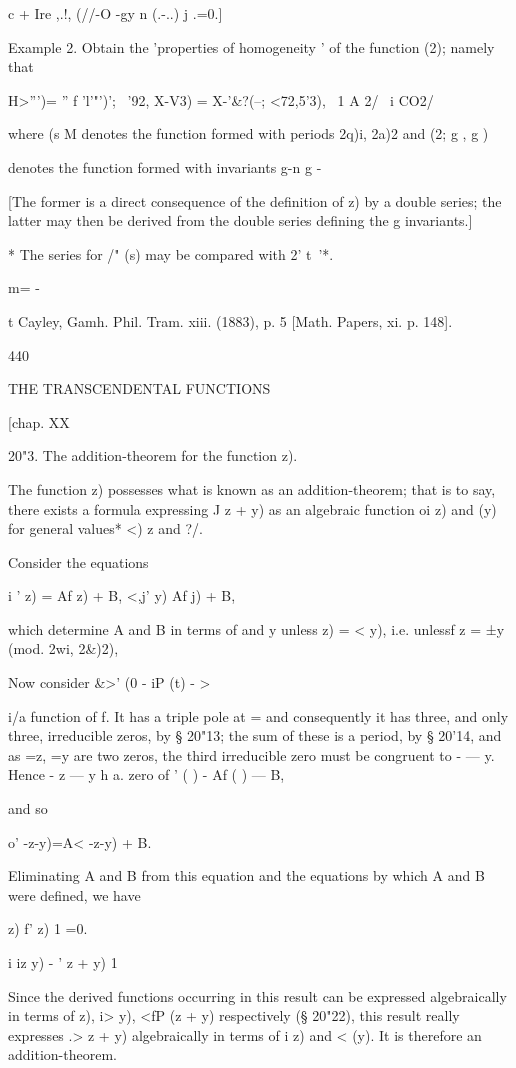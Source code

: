 {c + Ire ,.!, (//-O -gy n (.-..) j .=0.]

Example 2. Obtain the 'properties of homogeneity ' of the function
(2); namely that

 H>''')= '' f 'l'"')'; ~'92, X-V3) = X-'\&?(--; <72,5'3), \ 1 A 2/ \
i CO2/

where (s M denotes the function formed with periods 2q)i, 2a)2 and (2;
g , g )

denotes the function formed with invariants g-n g -

[The former is a direct consequence of the definition of z) by a
double series; the latter may then be derived from the double series
defining the g invariants.]

* The series for /" (s) may be compared with 2' t~'*.

m= -

t Cayley, Gamh. Phil. Tram. xiii. (1883), p. 5 [Math. Papers, xi. p.
148].

440

THE TRANSCENDENTAL FUNCTIONS

[chap. XX

20"3. The addition-theorem for the function z).

The function z) possesses what is known as an addition-theorem; that
is to say, there exists a formula expressing J z + y) as an algebraic
function oi z) and (y) for general values* <) z and ?/.

Consider the equations

i ' z) = Af z) + B, <,j' y) Af j) + B,

which determine A and B in terms of and y unless z) = < y), i.e.
unlessf z = ±y (mod. 2wi, 2\&)2),

Now consider \&>' (0 - iP (t) - >

 i/a function of f. It has a triple pole at = and consequently it has
three, and only three, irreducible zeros, by § 20"13; the sum of these
is a period, by § 20'14, and as =z, =y are two zeros, the third
irreducible zero must be congruent to - — y. Hence - z — y h a. zero
of ' ( ) - Af ( ) — B,

and so

 o' -z-y)=A< -z-y) + B.

Eliminating A and B from this equation and the equations by which A
and B were defined, we have

  z) f' z) 1 =0.

i iz y) - ' z + y) 1

Since the derived functions occurring in this result can be expressed
algebraically in terms of z), i> y), <fP (z + y) respectively (§
20"22), this result really expresses .> z + y) algebraically in terms
of i z) and < (y). It is therefore an addition-theorem.

}
